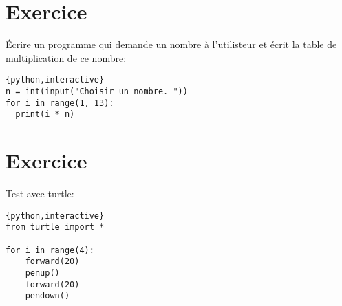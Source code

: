 \documentclass[a4paper,11pt]{article}
\begin{document}
\section{Exercice}
Écrire un programme qui demande un nombre à l'utilisteur et écrit la table de multiplication de ce nombre:\\
\begin{solution}
\begin{verbatim}{python,interactive}
n = int(input("Choisir un nombre. "))
for i in range(1, 13):
  print(i * n)
\end{verbatim}
\end{solution}

\section{Exercice}
Test avec turtle:\\
\begin{solution}
\begin{verbatim}{python,interactive}
from turtle import *

for i in range(4):
    forward(20)
    penup()
    forward(20)
    pendown()
\end{verbatim}
\end{solution}
\end{document}
